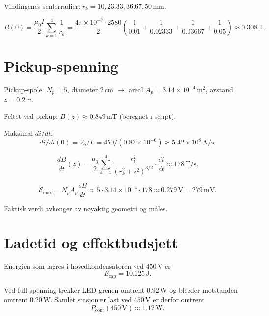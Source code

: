\documentclass{article}
\begin{document}
Vindingenes senterradier:
$r_k = 10, 23.33, 36.67, 50\,\text{mm}$.

\begin{equation}
B(0)
=
\frac{\mu_0 I}{2}
\sum_{k=1}^{4}\frac{1}{r_k}
=
\frac{4\pi\times10^{-7}\cdot2580}{2}
\left(
\frac{1}{0.01}
+
\frac{1}{0.02333}
+
\frac{1}{0.03667}
+
\frac{1}{0.05}
\right)
\approx 0.308\,\text{T}.
\end{equation}

\section{Pickup-spenning}

Pickup-spole: $N_p = 5$, diameter $2\,\text{cm}$
$\rightarrow$
areal $A_p = 3.14\times10^{-4}\,\text{m}^2$,
avstand $z = 0.2\,\text{m}$.

Feltet ved pickup:
$B(z) \approx 0.849\,\text{mT}$ (beregnet i script).

Maksimal $di/dt$:
\[
di/dt(0)
=
V_0/L
=
450/(0.83\times10^{-6})
\approx
5.42\times10^8\,\text{A/s}.
\]

\begin{equation}
\frac{dB}{dt}(z)
=
\frac{\mu_0}{2}
\sum_{k=1}^{4}
\frac{r_k^2}{(r_k^2+z^2)^{3/2}}
\cdot
\frac{di}{dt}
\approx
178\,\text{T/s}.
\end{equation}

\begin{equation}
\mathcal{E}_{\text{max}}
=
N_p A_p \frac{dB}{dt}
\approx
5 \cdot 3.14\times10^{-4} \cdot 178
\approx
0.279\,\text{V}
=
279\,\text{mV}.
\end{equation}

Faktisk verdi avhenger av nøyaktig geometri og måles.

\section{Ladetid og effektbudsjett}

Energien som lagres i hovedkondensatoren ved $450\,\text{V}$ er
\begin{equation}
E_{\text{cap}} = 10.125\,\text{J}.
\end{equation}

Ved full spenning trekker LED-grenen omtrent $0.92\,\text{W}$ og
bleeder-motstanden omtrent $0.20\,\text{W}$. Samlet stasjonær last ved
$450\,\text{V}$ er derfor omtrent
\begin{equation}
P_{\text{cont}}(450\,\text{V}) \approx 1.12\,\text{W}.
\end{equation}
\end{document}
